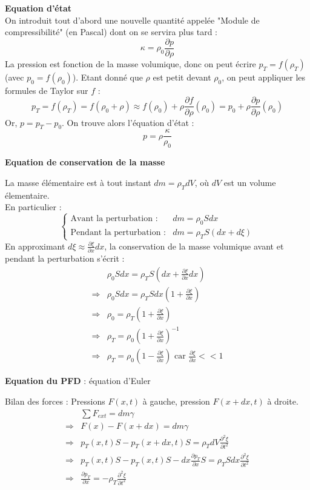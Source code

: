\noindent\textbf{Equation d'état}\\

On introduit tout d'abord une nouvelle quantité appelée "Module de compressibilité" (en Pascal) dont on se servira plus tard : \[\kappa=\rho_0\frac{\partial p}{\partial \rho}\]
La pression est fonction de la masse volumique, donc on peut écrire $p_T=f(\rho_T)$ (avec $p_0=f(\rho_0)$). Etant donné que $\rho$ est petit devant $\rho_0$, on peut appliquer les formules de Taylor sur $f$ :
\[p_T=f(\rho_T)=f(\rho_0+\rho)\approx f(\rho_0)+\rho\frac{\partial f}{\partial \rho}(\rho_0)=p_0+\rho\frac{\partial p}{\partial \rho}(\rho_0)\]
Or, $p=p_T-p_0$. On trouve alors l'équation d'état :
\[p=\rho\frac{\kappa}{\rho_0}\]

\noindent\textbf{Equation de conservation de la masse}

La masse élémentaire est à tout instant $dm=\rho_TdV$, où $dV$ est un volume élementaire.\\
En particulier :
\[
\left \{
\begin{array}{ll}
\textrm{Avant la perturbation :} & dm = \rho_0Sdx \\
\textrm{Pendant la perturbation :} & dm = \rho_TS(dx+d\xi)
\end{array}
\right.
\]
En approximant $d\xi\approx \frac{\partial\xi}{\partial x}dx$, la conservation de la masse volumique avant et pendant la perturbation s'écrit :
\[
\begin{array}{ll}
 & \rho_0Sdx = \rho_TS(dx+\frac{\partial\xi}{\partial x}dx)\\
\Rightarrow & \rho_0Sdx=\rho_TSdx(1+\frac{\partial\xi}{\partial x})\\
\Rightarrow & \rho_0=\rho_T(1+\frac{\partial\xi}{\partial x}) \\
\Rightarrow & \rho_T=\rho_0(1+\frac{\partial\xi}{\partial x})^{-1} \\
\Rightarrow & \rho_T=\rho_0(1-\frac{\partial\xi}{\partial x}) \textrm{ car } \frac{\partial\xi}{\partial x} << 1
\end{array}
\]

\noindent\textbf{Equation du PFD} : équation d'Euler

Bilan des forces : Pressions $F(x,t)$ à gauche, pression $F(x+dx,t)$ à droite.
\[
\begin{array}{ll}
& \sum F_{ext} = dm\gamma \\
\Rightarrow & F(x)-F(x+dx) = dm\gamma \\
\Rightarrow & p_T(x,t)S-p_T(x+dx, t)S=\rho_TdV\frac{\partial^2\xi}{\partial t^2} \\
\Rightarrow & p_T(x,t)S-p_T(x,t)S-dx\frac{\partial p_T}{\partial x}S=\rho_TSdx\frac{\partial^2\xi}{\partial t^2} \\
\Rightarrow & \frac{\partial p_T}{\partial x}=-\rho_T\frac{\partial^2\xi}{\partial t^2}
\end{array}
\]

